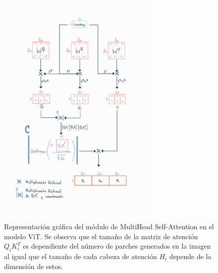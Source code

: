 {\begin{figure}[htp]
    \centering
    {\includegraphics[width=0.7\textwidth]{Chapters/4. ViT-Lung/images/cabezas_vit.jpg}}
\caption{Representación gráfica del módulo de MultiHead Self-Attention en el modelo ViT. Se observa
         que el tamaño de la matriz de atención $Q_i K_i^T$ es dependiente del número de parches
         generados en la imagen al igual que el tamaño de cada cabeza de atención $H_i$ depende de
         la dimensión de estos.}
\label{vit-head-dim}
\end{figure}





}
